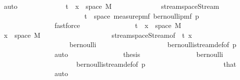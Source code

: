 \begin{isabellebody}
\ auto\isanewline
\ \ \ \ \ \ \ \ \ \ \isamarkupfalse%
\ \isamarkupfalse%
\ {\isachardoublequoteopen}{\isacharparenleft}{\kern0pt}t\ {\isacharhash}{\kern0pt}{\isacharhash}{\kern0pt}\ x{\isacharparenright}{\kern0pt}\ {\isasymin}\ space\ M{\isachardoublequoteclose}\isanewline
\ \ \ \ \ \ \ \ \ \ \ \ \isamarkupfalse%
\ stream{\isacharunderscore}{\kern0pt}space{\isacharunderscore}{\kern0pt}Stream\isanewline
\ \ \ \ \ \ \ \ \ \ \isamarkupfalse%
{\isacharminus}{\kern0pt}\isanewline
\ \ \ \ \ \ \ \ \ \ \ \ \isamarkupfalse%
\ {\isachardoublequoteopen}t\ {\isasymin}\ space\ {\isacharparenleft}{\kern0pt}measure{\isacharunderscore}{\kern0pt}pmf\ {\isacharparenleft}{\kern0pt}bernoulli{\isacharunderscore}{\kern0pt}pmf\ p{\isacharparenright}{\kern0pt}{\isacharparenright}{\kern0pt}{\isachardoublequoteclose}\isanewline
\ \ \ \ \ \ \ \ \ \ \ \ \ \ \isamarkupfalse%
\ fastforce\isanewline
\ \ \ \ \ \ \ \ \ \ \ \ \isamarkupfalse%
\ \isamarkupfalse%
\ {\isachardoublequoteopen}{\isacharparenleft}{\kern0pt}t\ {\isacharhash}{\kern0pt}{\isacharhash}{\kern0pt}\ x{\isacharparenright}{\kern0pt}\ {\isasymin}\ space\ M{\isachardoublequoteclose}\isanewline
\ \ \ \ \ \ \ \ \ \ \ \ \ \ \isamarkupfalse%
\ {\isacartoucheopen}x\ {\isasymin}\ space\ M{\isacartoucheclose}\isanewline
\ \ \ \ \ \ \ \ \ \ \ \ \ \ \ \ \ \ \ \ stream{\isacharunderscore}{\kern0pt}space{\isacharunderscore}{\kern0pt}Stream{\isacharbrackleft}{\kern0pt}of\ \ t\ x{\isacharbrackright}{\kern0pt}\isanewline
\ \ \ \ \ \ \ \ \ \ \ \ \ \ \ \ \ \ \ \ bernoulli\isanewline
\ \ \ \ \ \ \ \ \ \ \ \ \ \ \ \ \ \ \ \ bernoulli{\isacharunderscore}{\kern0pt}stream{\isacharunderscore}{\kern0pt}def{\isacharbrackleft}{\kern0pt}of\ p{\isacharbrackright}{\kern0pt}\isanewline
\ \ \ \ \ \ \ \ \ \ \ \ \ \ \isamarkupfalse%
\ auto\isanewline
\ \ \ \ \ \ \ \ \ \ \ \ \isamarkupfalse%
\ \isamarkupfalse%
\ {\isacharquery}{\kern0pt}thesis\isanewline
\ \ \ \ \ \ \ \ \ \ \ \ \ \ \isamarkupfalse%
\ bernoulli\isanewline
\ \ \ \ \ \ \ \ \ \ \ \ \ \ \ \ \ \ \ \ \ \ bernoulli{\isacharunderscore}{\kern0pt}stream{\isacharunderscore}{\kern0pt}def{\isacharbrackleft}{\kern0pt}of\ p{\isacharbrackright}{\kern0pt}\isanewline
\ \ \ \ \ \ \ \ \ \ \ \ \ \ \ \ \ \ \ \ \ \ that\isanewline
\ \ \ \ \ \ \ \ \ \ \ \ \ \ \isamarkupfalse%
\ auto\isanewline
\ \ \ \ \ \ \ \ \ \ \isamarkupfalse%
\isanewline
\ \ \ \ \ \ \ \ \ \ \isamarkupfalse%

\end{isabellebody}
